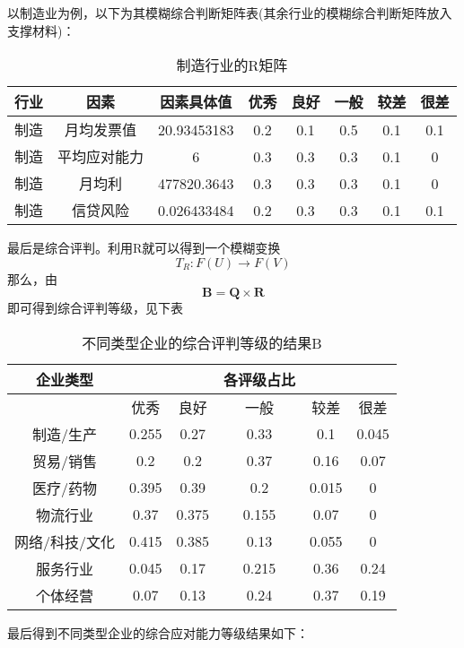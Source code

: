 \documentclass{cumcmthesis}
\begin{document}
以制造业为例，以下为其模糊综合判断矩阵表(其余行业的模糊综合判断矩阵放入支撑材料)：
\begin{table}[H]   %
	\caption{制造行业的R矩阵}	\centering
	\begin{tabular}{cccccccc}
		\toprule[1.5pt]
行业   & 因素     & 因素具体值  & 优秀  & 良好  & 一般  & 较差  & 很差  \\
		\midrule[1pt]

制造   & 月均发票值  & 20.93453183 & 0.2 & 0.1 & 0.5 & 0.1 & 0.1 \\
制造   & 平均应对能力 & 6           & 0.3 & 0.3 & 0.3 & 0.1 & 0    \\
制造   & 月均利    & 477820.3643 & 0.3 & 0.3 & 0.3 & 0.1 & 0    \\
制造   & 信贷风险   & 0.026433484 & 0.2 & 0.3 & 0.3 & 0.1 & 0.1  \\
		\bottomrule[1.5pt]
\end{tabular}
\end{table}	

最后是综合评判。利用R就可以得到一个模糊变换
\begin{equation}
T_R:F(U)\rightarrow F(V)
\end{equation}
那么，由$$\mathbf{B}=\mathbf{Q}\times\mathbf{R}$$即可得到综合评判等级，见下表

\begin{table}[H]   %
	\caption{不同类型企业的综合评判等级的结果B}	\centering
	\begin{tabular}{cccccc}
		\toprule[1.5pt]
		企业类型 & & & 各评级占比& & \\
		\midrule[1pt]
     & 优秀    & 良好    & 一般    & 较差    & 很差    \\
制造/生产   & 0.255 & 0.27  & 0.33  & 0.1   & 0.045 \\
贸易/销售   & 0.2   & 0.2   & 0.37  & 0.16  & 0.07  \\
医疗/药物   & 0.395 & 0.39  & 0.2   & 0.015 & 0     \\
物流行业   & 0.37  & 0.375 & 0.155 & 0.07  & 0     \\
网络/科技/文化 & 0.415 & 0.385 & 0.13  & 0.055 & 0     \\
服务行业   & 0.045 & 0.17  & 0.215 & 0.36  & 0.24  \\
个体经营 & 0.07  & 0.13  & 0.24  & 0.37  & 0.19 \\
		\bottomrule[1.5pt]
\end{tabular}
\end{table}	
最后得到不同类型企业的综合应对能力等级结果如下：
\end{document}
